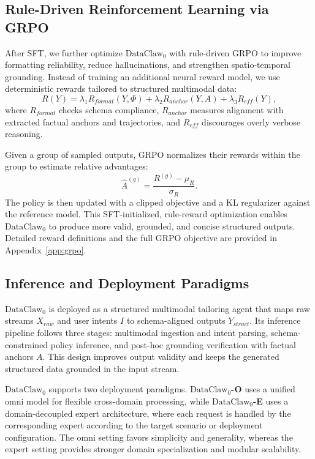 \subsection{Rule-Driven Reinforcement Learning via GRPO}

After SFT, we further optimize $\text{DataClaw}_0$ with rule-driven GRPO to improve formatting reliability, reduce hallucinations, and strengthen spatio-temporal grounding. Instead of training an additional neural reward model, we use deterministic rewards tailored to structured multimodal data:
\begin{equation}
R(Y)=\lambda_1R_{format}(Y,\Phi)+\lambda_2R_{anchor}(Y,A)+\lambda_3R_{eff}(Y),
\end{equation}
where \(R_{format}\) checks schema compliance, \(R_{anchor}\) measures alignment with extracted factual anchors and trajectories, and \(R_{eff}\) discourages overly verbose reasoning.

Given a group of sampled outputs, GRPO normalizes their rewards within the group to estimate relative advantages:
\begin{equation}
\hat{A}^{(g)}=\frac{R^{(g)}-\mu_R}{\sigma_R}.
\end{equation}
The policy is then updated with a clipped objective and a KL regularizer against the reference model. This SFT-initialized, rule-reward optimization enables $\text{DataClaw}_0$ to produce more valid, grounded, and concise structured outputs. Detailed reward definitions and the full GRPO objective are provided in Appendix~\ref{app:grpo}.



\subsection{Inference and Deployment Paradigms}

$\text{DataClaw}_0$ is deployed as a structured multimodal tailoring agent that maps raw streams \(X_{raw}\) and user intents \(I\) to schema-aligned outputs \(Y_{struct}\). 
Its inference pipeline follows three stages: multimodal ingestion and intent parsing, schema-constrained policy inference, and post-hoc grounding verification with factual anchors \(A\). This design improves output validity and keeps the generated structured data grounded in the input stream.

$\text{DataClaw}_0$ supports two deployment paradigms. \textbf{$\text{DataClaw}_0$-O} uses a unified omni model for flexible cross-domain processing, while \textbf{$\text{DataClaw}_0$-E} uses a domain-decoupled expert architecture, where each request is handled by the corresponding expert according to the target scenario or deployment configuration. The omni setting favors simplicity and generality, whereas the expert setting provides stronger domain specialization and modular scalability.

